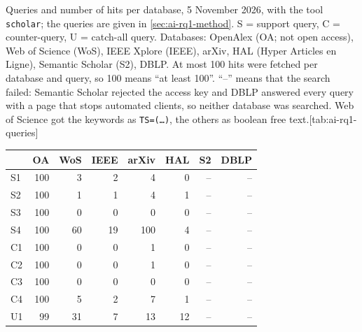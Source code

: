 \begin{table}[htbp]
  \begin{sidecaption}{Queries and number of hits per database, 5 November
    2026, with the tool \texttt{scholar}; the queries are given in
    \cref{sec:ai-rq1-method}.
    S = support query, C = counter-query, U = catch-all query.
    Databases: OpenAlex (OA; not open access), Web of Science (WoS), IEEE
    Xplore (IEEE), arXiv, HAL (Hyper Articles en Ligne), Semantic Scholar (S2),
    DBLP.
    At most 100 hits were fetched per database and query, so 100 means
    \enquote{at least 100}.
    \enquote{--} means that the search failed: Semantic Scholar rejected the
    access key and DBLP answered every query with a page that stops automated
    clients, so neither database was searched.
    Web of Science got the keywords as \texttt{TS=(\dots)}, the others as
    boolean free text.}[tab:ai-rq1-queries] \centering\footnotesize
    \begin{tabular}{@{}lrrrrrrr@{}}
      \toprule
         & OA  & WoS & IEEE & arXiv & HAL & S2 & DBLP \\
      \midrule
      S1 & 100 & 3   & 2    & 4     & 0   & -- & --   \\
      S2 & 100 & 1   & 1    & 4     & 1   & -- & --   \\
      S3 & 100 & 0   & 0    & 0     & 0   & -- & --   \\
      S4 & 100 & 60  & 19   & 100   & 4   & -- & --   \\
      \midrule
      C1 & 100 & 0   & 0    & 1     & 0   & -- & --   \\
      C2 & 100 & 0   & 0    & 1     & 0   & -- & --   \\
      C3 & 100 & 0   & 0    & 0     & 0   & -- & --   \\
      C4 & 100 & 5   & 2    & 7     & 1   & -- & --   \\
      \midrule
      U1 & 99  & 31  & 7    & 13    & 12  & -- & --   \\
      \bottomrule
    \end{tabular}
  \end{sidecaption}
\end{table}


